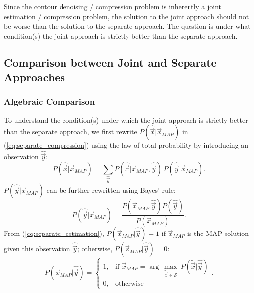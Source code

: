 Since the contour denoising / compression problem is inherently a joint estimation /  compression problem, the solution to the joint approach should not be worse than the solution to the separate approach.
The question is under what condition(s) the joint approach is strictly better than the separate approach.


\subsection{Comparison between Joint and Separate Approaches}
\label{subsec:analysis_comparison}

\subsubsection{Algebraic Comparison}

To understand the condition(s) under which the joint approach is strictly better than the separate approach, we first rewrite $P(\hat{\vec{x}}|\vec{x}_{MAP})$ in (\ref{eq:separate_compression}) using the law of total probability by introducing an observation $\hat{\vec{y}}$:
\begin{equation}
P(\hat{\vec{x}}|\vec{x}_{MAP}) = \sum_{\hat{\vec{y}}} P(\hat{\vec{x}}|\vec{x}_{MAP},\hat{\vec{y}})\,P(\hat{\vec{y}}|\vec{x}_{MAP}).
\label{eq:comparison_total}
\end{equation}
$P(\hat{\vec{y}}|\vec{x}_{MAP})$ can be further rewritten using Bayes' rule:
\begin{equation}
P(\hat{\vec{y}}|\vec{x}_{MAP}) = \frac{P(\vec{x}_{MAP}|\hat{\vec{y}})P(\hat{\vec{y}})}{P(\vec{x}_{MAP})}.
\label{eq:comparison_bayes}
\end{equation}
From (\ref{eq:separate_estimation}), $P(\vec{x}_{MAP}|\hat{\vec{y}}) = 1$ if $\vec{x}_{MAP}$ is the MAP solution given this observation $\hat{\vec{y}}$; otherwise, $P(\vec{x}_{MAP}|\hat{\vec{y}}) = 0$:
\begin{equation}
P(\vec{x}_{MAP}|\hat{\vec{y}}) = 
\begin{cases}
1, & \text{if } \vec{x}_{MAP} = \arg\,\underset{\tilde{\vec{x}}\in  \mathcal{S}}{\max} \ P(\tilde{\vec{x}}|\hat{\vec{y}}) \\
0, & \text{otherwise}
\end{cases}.
\label{eq:comparison_cases}
\end{equation}

